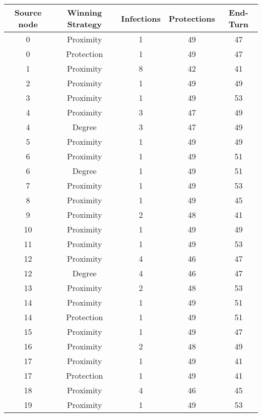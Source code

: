 \documentclass[results.tex]{subfiles}
\begin{document}
\begin{center}
  \begin{tabular}{| c || c | c | c | c |}
    \hline
    {\bfseries Source node} & {\bfseries Winning Strategy} & {\bfseries Infections} & {\bfseries Protections} & {\bfseries End-Turn} \\  %
    \hline\hline
    0 & Proximity & 1 & 49 & 47 \\ 
    \hline
    0 & Protection & 1 & 49 & 47 \\ 
    \hline
    1 & Proximity & 8 & 42 & 41 \\ 
    \hline
    2 & Proximity & 1 & 49 & 49 \\ 
    \hline
    3 & Proximity & 1 & 49 & 53 \\ 
    \hline
    4 & Proximity & 3 & 47 & 49 \\ 
    \hline
    4 & Degree & 3 & 47 & 49 \\ 
    \hline
    5 & Proximity & 1 & 49 & 49 \\ 
    \hline
    6 & Proximity & 1 & 49 & 51 \\ 
    \hline
    6 & Degree & 1 & 49 & 51 \\ 
    \hline
    7 & Proximity & 1 & 49 & 53 \\ 
    \hline
    8 & Proximity & 1 & 49 & 45 \\ 
    \hline
    9 & Proximity & 2 & 48 & 41 \\ 
    \hline
    10 & Proximity & 1 & 49 & 49 \\ 
    \hline
    11 & Proximity & 1 & 49 & 53 \\ 
    \hline
    12 & Proximity & 4 & 46 & 47 \\ 
    \hline
    12 & Degree & 4 & 46 & 47 \\ 
    \hline
    13 & Proximity & 2 & 48 & 53 \\ 
    \hline
    14 & Proximity & 1 & 49 & 51 \\ 
    \hline
    14 & Protection & 1 & 49 & 51 \\ 
    \hline
    15 & Proximity & 1 & 49 & 47 \\ 
    \hline
    16 & Proximity & 2 & 48 & 49 \\ 
    \hline
    17 & Proximity & 1 & 49 & 41 \\ 
    \hline
    17 & Protection & 1 & 49 & 41 \\ 
    \hline
    18 & Proximity & 4 & 46 & 45 \\ 
    \hline
    19 & Proximity & 1 & 49 & 53 \\ 

\end{tabular}
\end{center}
\end{document}
